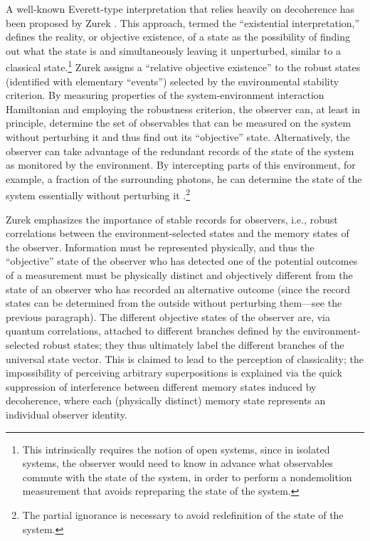 \documentclass[twocolumn,rmp,aps,amsmath,amsfonts,noshowkeys,noshowpacs]{revtex4}
\newcommand{\cf}{cf.\ }
\begin{document}
A well-known Everett-type interpretation that relies heavily on
decoherence has been proposed by Zurek
\citetext{\citeyear{Zurek:1993:pu}, \citeyear{Zurek:1998:re}; see also
  the recent reevaluation in \citealp{Zurek:2004:yb}}.  This approach,
termed the ``existential interpretation,'' defines the reality, or
objective existence, of a state as the possibility of finding out what
the state is and simultaneously leaving it unperturbed, similar to a
classical state.\footnote{This intrinsically requires the notion of
  open systems, since in isolated systems, the observer would need to
  know in advance what observables commute with the state of the
  system, in order to perform a nondemolition measurement that avoids
  repreparing the state of the system.} Zurek assigns a ``relative
objective existence'' to the robust states (identified with elementary
``events'') selected by the environmental stability criterion. By
measuring properties of the system-environment interaction
Hamiltonian and employing the robustness criterion, the observer can,
at least in principle, determine the set of observables that can be
measured on the system without perturbing it and thus find out its
``objective'' state.  Alternatively, the observer can take advantage
of the redundant records of the state of the system as monitored by
the environment. By intercepting parts of this environment, for
example, a fraction of the surrounding photons, he can determine the
state of the system essentially without perturbing it \citep[\cf also
the related recent ideas of ``quantum Darwinism'' and the role of the
environment as a ``witness,''
see][]{Zurek:2000:tr,Zurek:2002:ii,Zurek:2003:pl,Ollivier:2003:za}.\footnote{The
  partial ignorance is necessary to avoid  redefinition of the
  state of the system.}

Zurek emphasizes the importance of stable records for observers, i.e.,
robust correlations between the environment-selected states and the
memory states of the observer. Information must be represented
physically, and thus the ``objective'' state of the observer who has
detected one of the potential outcomes of a measurement must be
physically distinct and objectively different from the state of an
observer who has recorded an alternative outcome (since the record
states can be determined from the outside without perturbing
them---see the previous paragraph). The different objective states
of the observer are, via quantum correlations, attached to different
branches defined by the environment-selected robust states; they thus
ultimately label the different branches of the universal state
vector. This is claimed to lead to the perception of classicality; the
impossibility of perceiving arbitrary superpositions is explained via
the quick suppression of interference between different memory states
induced by decoherence, where each (physically distinct) memory state
represents an individual observer identity.
\end{document}
